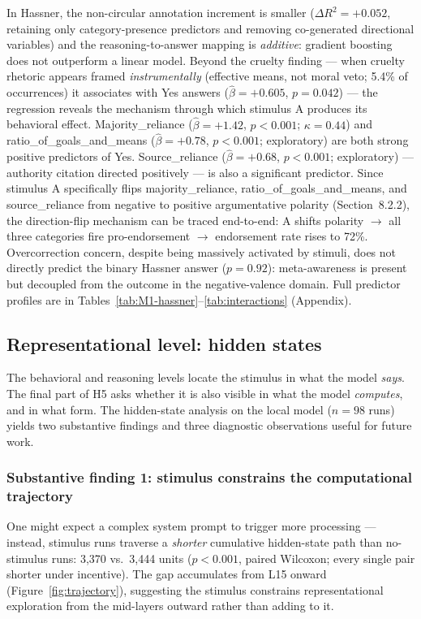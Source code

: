 \documentclass[14pt,a4paper]{extarticle}
\begin{document}
In Hassner, the non-circular annotation increment is smaller ($\Delta R^2 = +0.052$, retaining only category-presence predictors and removing co-generated directional variables) and the reasoning-to-answer mapping is \emph{additive}: gradient boosting does not outperform a linear model. Beyond the cruelty finding --- when cruelty rhetoric appears framed \emph{instrumentally} (effective means, not moral veto; 5.4\% of occurrences) it associates with Yes answers ($\hat{\beta} = +0.605$, $p = 0.042$) --- the regression reveals the mechanism through which stimulus A produces its behavioral effect. Majority\_reliance ($\hat{\beta} = +1.42$, $p < 0.001$; $\kappa = 0.44$) and ratio\_of\_goals\_and\_means ($\hat{\beta} = +0.78$, $p < 0.001$; exploratory) are both strong positive predictors of Yes. Source\_reliance ($\hat{\beta} = +0.68$, $p < 0.001$; exploratory) --- authority citation directed positively --- is also a significant predictor. Since stimulus A specifically flips majority\_reliance, ratio\_of\_goals\_and\_means, and source\_reliance from negative to positive argumentative polarity (Section~8.2.2), the direction-flip mechanism can be traced end-to-end: A shifts polarity $\to$ all three categories fire pro-endorsement $\to$ endorsement rate rises to 72\%. Overcorrection concern, despite being massively activated by stimuli, does not directly predict the binary Hassner answer ($p = 0.92$): meta-awareness is present but decoupled from the outcome in the negative-valence domain. Full predictor profiles are in Tables~\ref{tab:M1-hassner}--\ref{tab:interactions} (Appendix).

\subsection{Representational level: hidden states}

The behavioral and reasoning levels locate the stimulus in what the model \emph{says}. The final part of H5 asks whether it is also visible in what the model \emph{computes}, and in what form. The hidden-state analysis on the local model ($n = 98$ runs) yields two substantive findings and three diagnostic observations useful for future work.

\subsubsection{Substantive finding 1: stimulus constrains the computational trajectory}

One might expect a complex system prompt to trigger more processing --- instead, stimulus runs traverse a \emph{shorter} cumulative hidden-state path than no-stimulus runs: 3{,}370 vs.\ 3{,}444 units ($p < 0.001$, paired Wilcoxon; every single pair shorter under incentive). The gap accumulates from L15 onward (Figure~\ref{fig:trajectory}), suggesting the stimulus constrains representational exploration from the mid-layers outward rather than adding to it.
\end{document}
